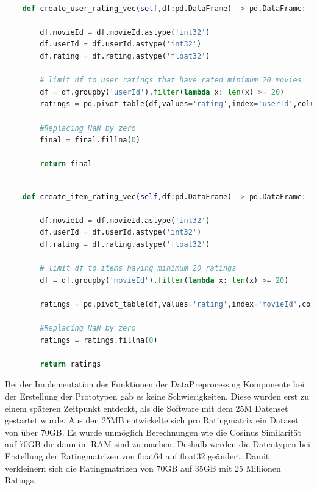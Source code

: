 \begin{lstlisting}[language=Python, caption= Funktion zur Erstellung der User Ratingmatrix, label=lst:Ratingmatrix User]

    def create_user_rating_vec(self,df:pd.DataFrame) -> pd.DataFrame:
       
        df.movieId = df.movieId.astype('int32')
        df.userId = df.userId.astype('int32')
        df.rating = df.rating.astype('float32')
       
        # limit df to user ratings that have rated minimum 20 movies
        df = df.groupby('userId').filter(lambda x: len(x) >= 20)
        ratings = pd.pivot_table(df,values='rating',index='userId',columns='movieId')
       
        #Replacing NaN by zero
        final = final.fillna(0)

        return final
\end{lstlisting}

\begin{lstlisting}[language=Python, caption= Funktion zur Erstellung der Item Ratingmatrix, label=lst:Ratingmatrix Item]

    def create_item_rating_vec(self,df:pd.DataFrame) -> pd.DataFrame:
        
        df.movieId = df.movieId.astype('int32')
        df.userId = df.userId.astype('int32')
        df.rating = df.rating.astype('float32')
        
        # limit df to items having minimum 20 ratings 
        df = df.groupby('movieId').filter(lambda x: len(x) >= 20)
        
        ratings = pd.pivot_table(df,values='rating',index='movieId',columns='userId') #ratings #fill_value=0
        
        #Replacing NaN by zero
        ratings = ratings.fillna(0)
       
        return ratings
\end{lstlisting}

Bei der Implementation der Funktionen der DataPreprocessing Komponente bei der Erstellung der Prototypen gab es keine Schwierigkeiten. Diese wurden erst zu einem späteren Zeitpunkt entdeckt, als die Software mit dem 25M Datenset gestartet wurde. Aus den 25MB entwickelte sich pro Ratingmatrix ein Dataset von über 70GB. Es wurde unmöglich Berechnungen wie die Cosinus Similarität auf 70GB die dann im RAM sind zu machen. Deshalb werden die Datentypen bei Erstellung der Ratingmatrizen von float64 auf float32 geändert. Damit verkleinern sich die Ratingmatrizen von 70GB auf 35GB mit 25 Millionen Ratings.

